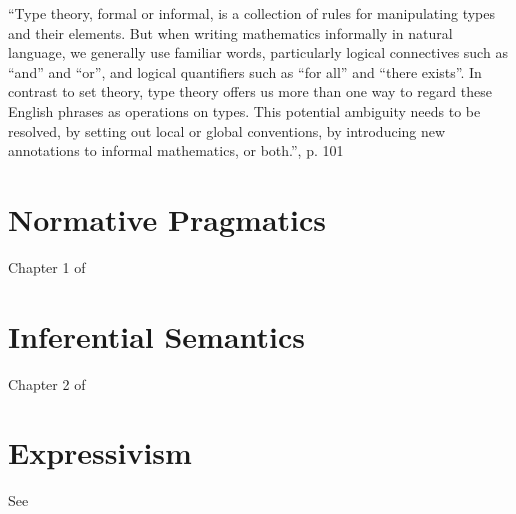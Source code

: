 ``Type theory, formal or informal, is a collection of rules for
manipulating types and their elements.  But when writing mathematics
informally in natural language, we generally use familiar words,
particularly logical connectives such as “and” and “or”, and logical
quantifiers such as “for all” and “there exists”. In contrast to set
theory, type theory offers us more than one way to regard these
English phrases as operations on types. This potential ambiguity needs
to be resolved, by setting out local or global conventions, by
introducing new annotations to informal mathematics, or both.''\HoTTB, p. 101

\section{Normative Pragmatics}
\label{subs:normprag}

  Chapter 1 of \cite{brandom_mie}

\section{Inferential Semantics}
\label{subs:inferentialism}

  Chapter 2 of \cite{brandom_mie}


\section{Expressivism}
\label{subs:expressivism}

See \cite{price_expressivism_2013}
